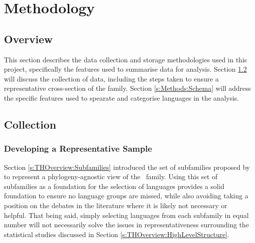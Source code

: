 \chapter{Methodology}
\section{Overview}
This section describes the data collection and storage methodologies used in this project, specifically the features used to summarise data for analysis. Section \ref{s:Methods:Collection} will discuss the collection of data, including the steps taken to ensure a representative cross-section of the \lfam family. Section \ref{s:Methods:Schema} will address the specific features used to spearate and categorise languages in the analysis.

\section{Collection}\label{s:Methods:Collection}
\subsection{Developing a Representative Sample}\label{ss:Methods:RepSample}
Section \ref{s:THOverview:Subfamilies} introduced the set of subfamilies proposed by  to represent a phylogeny-agnostic view of the \lfam\ family. Using this set of subfamilies as a foundation for the selection of languages provides a solid foundation to ensure no language groups are missed, while also avoiding taking a position on the debates in the literature where it is likely not necessary or helpful. That being said, simply selecting languages from each subfamily in equal number will not necessarily solve the issues in representativeness surrounding the statistical studies discussed in Section \ref{s:THOverview:HighLevelStructure}.

